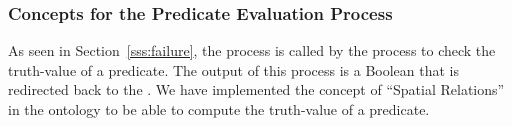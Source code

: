 % 
% 
% 

\subsubsection{Concepts for the Predicate Evaluation Process}
As seen in Section~\ref{sss:failure}, the  process is called by the  process to check the truth-value of a predicate. The output of this process is a Boolean that is redirected back to the . We have implemented the concept of ``Spatial Relations'' in the  ontology to be able to compute the truth-value of a predicate.

